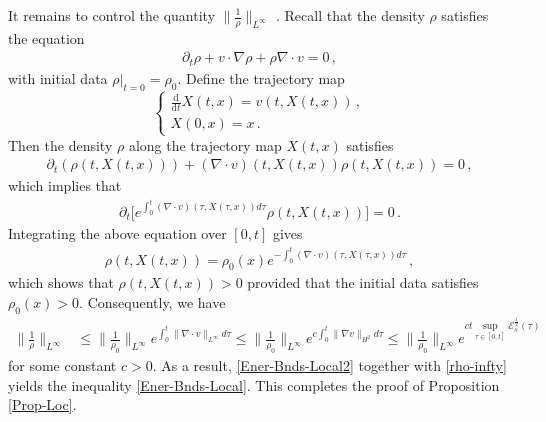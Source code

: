 \documentclass[reqno,11pt]{amsart}
\numberwithin{equation}{section}
\def\p{\partial}
\def\d{\mathrm{d}}
\begin{document}
It remains to control the quantity $\|\frac{1}{\rho}\|_{L^\infty}$ . Recall that the density $\rho$ satisfies the equation
\begin{equation*}
\begin{aligned}
\p_t\rho+v\cdot\nabla\rho+\rho\nabla\cdot v=0\,,
\end{aligned}
\end{equation*}
with initial data $\rho|_{t=0}=\rho_0$. Define the trajectory map
\[
\begin{cases}
\frac{\d}{\d t} X(t, x) = v (t, X(t, x)) \,, \\
X(0, x) = x \,.
\end{cases}
\]
Then the density $\rho$ along the trajectory map $X (t,x)$ satisfies
\begin{equation*}
\begin{aligned}
\p_t(\rho(t,X(t,x)))+(\nabla\cdot v)(t,X(t,x))\rho(t,X(t,x))=0
\,,
\end{aligned}
\end{equation*}
which implies that
\begin{equation*}
\begin{aligned}
\p_t\Big[e^{\int^t_0(\nabla\cdot v)(\tau,X(\tau,x))d\tau}\rho(t,X(t,x))\Big]=0 \,.
\end{aligned}
\end{equation*}
Integrating the above equation over $[0,t]$ gives
\begin{equation*}
\begin{aligned}
\rho(t,X(t,x))=\rho_0 (x) e^{-\int^t_0(\nabla\cdot v)(\tau,X(\tau,x))d\tau} \,,
\end{aligned}
\end{equation*}
which shows that $\rho(t, X(t,x)) > 0$ provided that the initial data satisfies $\rho_0(x) > 0$. Consequently, we have 
\begin{equation}\label{rho-infty}
\begin{aligned}
\| \frac{1}{\rho} \|_{L^\infty} &\leq \| \frac{1}{\rho_0} \|_{L^\infty} e^{\int_0^t \| \nabla \cdot v \|_{L^\infty} d\tau} \leq \| \frac{1}{\rho_0} \|_{L^\infty} e^{c \int_0^t \| \nabla v \|_{H^2} d\tau} \leq\| \frac{1}{\rho_0} \|_{L^\infty} e^{c t \sup_{\tau \in [0,t]} \mathcal{E}_s^{\frac{1}{2}}(\tau)} 
\end{aligned}
\end{equation}
for some constant $c > 0$. As a result, \eqref{Ener-Bnds-Local2} together with \eqref{rho-infty} yields the inequality \eqref{Ener-Bnds-Local}. This completes the proof of Proposition \ref{Prop-Loc}.
\end{document}

